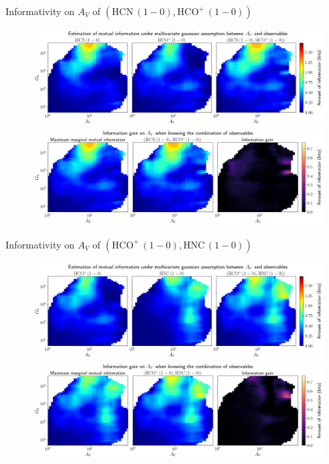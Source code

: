 \documentclass{beamer}
\begin{document}
\begin{frame}{Informativity on $A_V$ of $\left(\mathrm{HCN\,(1-0)},\mathrm{HCO^+\,(1-0)}\right)$}
    \begin{figure}
        \centering
        \includegraphics[width=0.95\linewidth]{../linearinfo/av__hcn10_hcop10_linearinfo.png}
        \vfill
        \includegraphics[width=0.95\linewidth]{../linearinfo/av__hcn10_hcop10_linearinfo_gain.png}
    \end{figure}
\end{frame}

\begin{frame}{Informativity on $A_V$ of $\left(\mathrm{HCO^+\,(1-0)},\mathrm{HNC\,(1-0)}\right)$}
    \begin{figure}
        \centering
        \includegraphics[width=0.95\linewidth]{../linearinfo/av__hcop10_hnc10_linearinfo.png}
        \vfill
        \includegraphics[width=0.95\linewidth]{../linearinfo/av__hcop10_hnc10_linearinfo_gain.png}
    \end{figure}
\end{frame}
\end{document}
